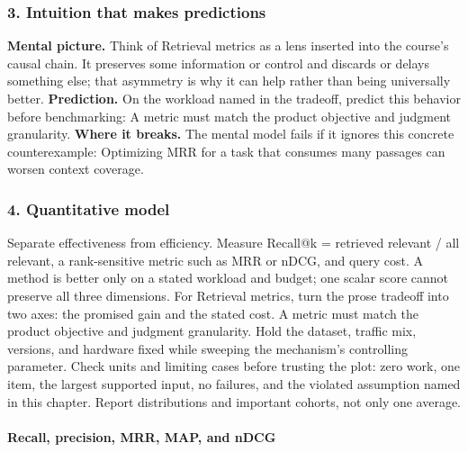 \subsubsection*{3. Intuition that makes predictions}
\textbf{Mental picture.} Think of Retrieval metrics as a lens inserted into the course's causal chain. It preserves some information or control and discards or delays something else; that asymmetry is why it can help rather than being universally better.
\textbf{Prediction.} On the workload named in the tradeoff, predict this behavior before benchmarking: A metric must match the product objective and judgment granularity.
\textbf{Where it breaks.} The mental model fails if it ignores this concrete counterexample: Optimizing MRR for a task that consumes many passages can worsen context coverage.
\subsubsection*{4. Quantitative model}
Separate effectiveness from efficiency. Measure Recall@k = retrieved relevant / all relevant, a rank-sensitive metric such as MRR or nDCG, and query cost. A method is better only on a stated workload and budget; one scalar score cannot preserve all three dimensions.
For Retrieval metrics, turn the prose tradeoff into two axes: the promised gain and the stated cost. A metric must match the product objective and judgment granularity. Hold the dataset, traffic mix, versions, and hardware fixed while sweeping the mechanism's controlling parameter.
Check units and limiting cases before trusting the plot: zero work, one item, the largest supported input, no failures, and the violated assumption named in this chapter. Report distributions and important cohorts, not only one average.
\paragraph{Recall, precision, MRR, MAP, and nDCG}
